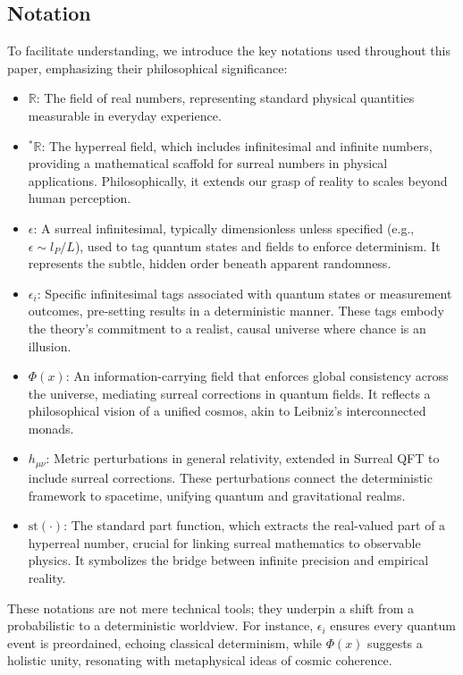 \documentclass{article}
\begin{document}
\subsection{Notation}
To facilitate understanding, we introduce the key notations used throughout this paper, emphasizing their philosophical significance:
\begin{itemize}
    \item \(\mathbb{R}\): The field of real numbers, representing standard physical quantities measurable in everyday experience.
    \item \({}^*\mathbb{R}\): The hyperreal field, which includes infinitesimal and infinite numbers, providing a mathematical scaffold for surreal numbers in physical applications. Philosophically, it extends our grasp of reality to scales beyond human perception.
    \item \(\epsilon\): A surreal infinitesimal, typically dimensionless unless specified (e.g., \(\epsilon \sim l_P / L\)), used to tag quantum states and fields to enforce determinism. It represents the subtle, hidden order beneath apparent randomness.
    \item \(\epsilon_i\): Specific infinitesimal tags associated with quantum states or measurement outcomes, pre-setting results in a deterministic manner. These tags embody the theory's commitment to a realist, causal universe where chance is an illusion.
    \item \(\Phi(x)\): An information-carrying field that enforces global consistency across the universe, mediating surreal corrections in quantum fields. It reflects a philosophical vision of a unified cosmos, akin to Leibniz's interconnected monads.
    \item \(h_{\mu\nu}\): Metric perturbations in general relativity, extended in Surreal QFT to include surreal corrections. These perturbations connect the deterministic framework to spacetime, unifying quantum and gravitational realms.
    \item \(\text{st}(\cdot)\): The standard part function, which extracts the real-valued part of a hyperreal number, crucial for linking surreal mathematics to observable physics. It symbolizes the bridge between infinite precision and empirical reality.
\end{itemize}
These notations are not mere technical tools; they underpin a shift from a probabilistic to a deterministic worldview. For instance, \(\epsilon_i\) ensures every quantum event is preordained, echoing classical determinism, while \(\Phi(x)\) suggests a holistic unity, resonating with metaphysical ideas of cosmic coherence.
\end{document}
